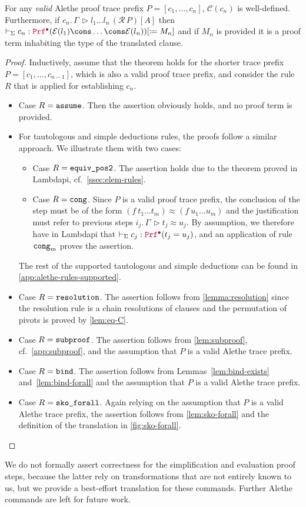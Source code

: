 \begin{theorem}\label{theorem:soundness}
  For any \emph{valid} Alethe proof trace prefix $P = [c_1, \dots, c_n]$, $\mathcal{C}(c_n)$ is well-defined. Furthermore, if $c_n.\,\Gamma\, \triangleright l_1 \dots l_n \, (\mathcal{R}\,P)[A]$ then $\vdash_\Sigma c_n : \pid (\E{l_1} \cons \dots  \cons \E{l_n}) [\coloneq M_n]$ and if $M_n$ is provided it is a proof term inhabiting the type of the translated clause.
\end{theorem}
\begin{proof}
  Inductively, assume that the theorem holds for the shorter trace prefix $P = [c_1, \dots, c_{n-1}]$, which is also a valid proof trace prefix, and consider the rule $R$ that is applied for establishing $c_n$.
  \begin{itemize}
  \item Case $R = \texttt{\upshape{assume}}$. Then the assertion obviously holds, and no proof term is provided.
  \item For tautologous and simple deductions rules, the proofs follow a similar approach. We illustrate them with two cases:
  \begin{itemize}
  \item Case $R = \texttt{\upshape{equiv\_pos2}}$. The assertion holds due to the theorem  proved in Lambdapi, cf.\ \cref{ssec:elem-rules}.
  \item Case $R = \texttt{\upshape{cong}}$. Since $P$ is a valid proof trace prefix, the conclusion of the step must be of the form $(f~t_1 \ldots t_m) \approx (f~u_1 \ldots u_m)$ and the justification must refer to previous steps $i_j.\,\Gamma\,\triangleright t_j \approx u_j$. By assumption, we therefore have in Lambdapi that $\vdash_{\Sigma} c_j: \textcolor{purple}{\texttt{\upshape{Prf}}^\bullet} (t_j = u_j)$, and an application of rule $\texttt{\upshape{cong}}_m$ proves the assertion.
  \end{itemize}
  The rest of the supported tautologous and simple deductions can be found in \cref{app:alethe-rules-supported}.
  \item Case $R = \texttt{\upshape{resolution}}$. The assertion follows from \cref{lemma:resolution} since the resolution rule is a chain resolutions of clauses and the permutation of pivots is proved by \cref{lem:eq-C}.
  \item Case $R = \texttt{\upshape{subproof}}$. The assertion follows from \cref{lem:subproof}, cf.\ \cref{app:subproof}, and the assumption that $P$ is a valid Alethe trace prefix.
  \item Case $R = \texttt{\upshape{bind}}$. The assertion follows from Lemmas~\ref{lem:bind-exists} and~\ref{lem:bind-forall} and the assumption that $P$ is a valid Alethe trace prefix.
  \item Case $R = \texttt{\upshape{sko\_forall}}$. Again relying on the assumption that $P$ is a valid Alethe trace prefix, the assertion follows from \cref{lem:sko-forall} and the definition of the translation in \cref{fig:sko-forall}.
  \end{itemize}
\end{proof}

We do not formally assert correctness for the simplification and evaluation proof steps, because the latter rely on transformations that are not entirely known to us, but we provide a best-effort translation for these commands. Further Alethe commands are left for future work.
